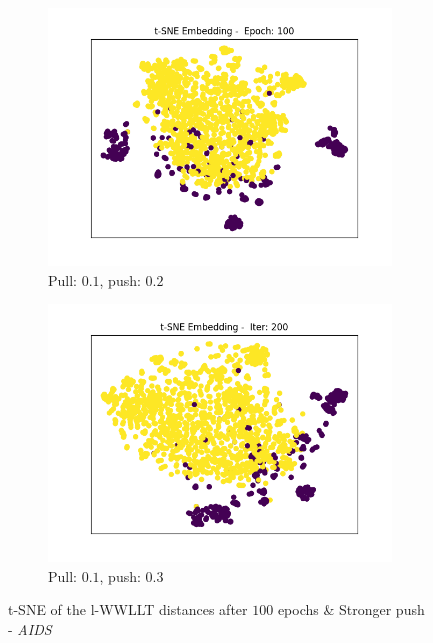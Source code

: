 		\begin{figure}[H]
			\centering
			\begin{subfigure}{0.49\textwidth}
				\centering
				\includegraphics[width=1.1\linewidth]{images/plotA4_tSNE_e100_AIDS_E_GDL_09_01h_00m} %
				\caption{Pull: $0.1$, push: $0.2$}
				\label{fig:plota4tsnee100aidsegdl0901h00m}
			\end{subfigure}
			\begin{subfigure}{0.49\textwidth}
				\centering
				\includegraphics[width=1.1\linewidth]{images/plotA4_tSNE_e100_AIDS_E_GDL_03_02h-53m} %
				\caption{Pull: $0.1$, push: $0.3$}
				\label{fig:plota4tsnee100aidsegdl0302h-53m}
			\end{subfigure}
			\caption{t-SNE of the l-WWLLT distances after $100$ epochs \& Stronger push - \textit{AIDS}}
			\label{fig:tSNE_100_C}
		\end{figure}
		
